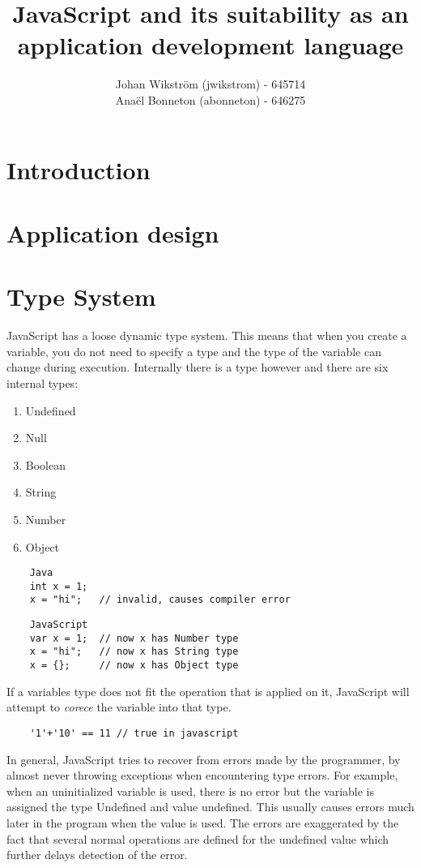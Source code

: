 \documentclass{report}
\title{JavaScript and its suitability as an application development language}
\author{Johan Wikström (jwikstrom) - 645714\\
Anaël Bonneton (abonneton) - 646275 
}
\begin{document}
\maketitle
\tableofcontents

\section{Introduction}


\section{Application design}



\section{Type System}
	JavaScript has a loose dynamic type system. This means that when you create a variable, you do not need to specify a type and the type of the variable can change during execution. Internally there is a type however and there are six internal types:
	\begin{enumerate}
	\item Undefined
	\item Null
	\item Boolean
	\item String
	\item Number
	\item Object
	\end{enumerate}
		\begin{verbatim}
	Java
	int x = 1;
	x = "hi";   // invalid, causes compiler error
	\end{verbatim}
	\begin{verbatim}
	JavaScript
	var x = 1;  // now x has Number type
	x = "hi";   // now x has String type
	x = {};     // now x has Object type
	\end{verbatim}
	If a variables type does not fit the operation that is applied on it, JavaScript will attempt to \emph{corece} the variable into that type.
	\begin{verbatim}
	'1'+'10' == 11 // true in javascript
	\end{verbatim}
	In general, JavaScript tries to recover from errors made by the programmer, by almost never throwing exceptions when encountering type errors. For example, when an uninitialized variable is used, there is no error but the variable is assigned the type Undefined and value undefined. This usually causes errors much later in the program when the value is used. The errors are exaggerated by the fact that several normal operations are defined for the undefined value which further delays detection of the error.
\end{document}
